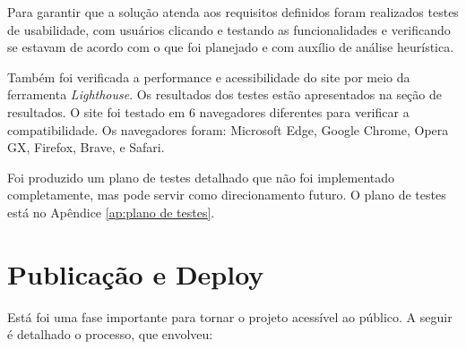 Para garantir que a solução atenda aos requisitos definidos foram realizados testes de usabilidade, com usuários clicando e testando as funcionalidades e verificando se estavam de acordo com o que foi planejado e com auxílio de análise heurística.

Também foi verificada a performance e acessibilidade do site por meio da ferramenta \textit{Lighthouse}. Os resultados dos testes estão apresentados na seção de resultados.
O site foi testado em 6 navegadores diferentes para verificar a compatibilidade. Os navegadores foram: Microsoft Edge, Google Chrome, Opera GX, Firefox, Brave, e Safari.

Foi produzido um plano de testes detalhado que não foi implementado completamente, mas pode servir como direcionamento futuro. O plano de testes está no Apêndice \ref{ap:plano de testes}.

\section{Publicação e Deploy}
\label{sec:publicacao_deploy}

Está foi uma fase importante para tornar o projeto acessível ao público. A seguir é detalhado o processo, que envolveu:

